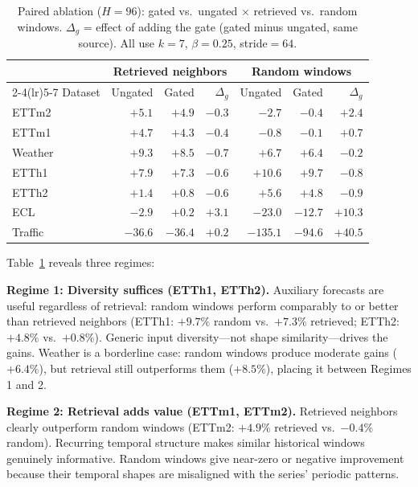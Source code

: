 \documentclass{article}
\begin{document}
\begin{table}[t]
\centering
\caption{Paired ablation ($H{=}96$): gated vs.\ ungated $\times$ retrieved vs.\ random windows. $\Delta_g$ = effect of adding the gate (gated minus ungated, same source). All use $k{=}7$, $\beta{=}0.25$, stride${=}64$.}
\label{tab:decomp}
\small
\begin{tabular}{l r r r r r r}
\toprule
& \multicolumn{3}{c}{Retrieved neighbors} & \multicolumn{3}{c}{Random windows} \\
\cmidrule(lr){2-4}\cmidrule(lr){5-7}
Dataset & Ungated & Gated & $\Delta_g$ & Ungated & Gated & $\Delta_g$ \\
\midrule
ETTm2 & $+5.1$ & $+4.9$ & $-0.3$ & $-2.7$ & $-0.4$ & $+2.4$ \\
ETTm1 & $+4.7$ & $+4.3$ & $-0.4$ & $-0.8$ & $-0.1$ & $+0.7$ \\
Weather & $+9.3$ & $+8.5$ & $-0.7$ & $+6.7$ & $+6.4$ & $-0.2$ \\
ETTh1 & $+7.9$ & $+7.3$ & $-0.6$ & $+10.6$ & $+9.7$ & $-0.8$ \\
ETTh2 & $+1.4$ & $+0.8$ & $-0.6$ & $+5.6$ & $+4.8$ & $-0.9$ \\
\midrule
ECL & $-2.9$ & $+0.2$ & $\mathbf{+3.1}$ & $-23.0$ & $-12.7$ & $\mathbf{+10.3}$ \\
Traffic & $-36.6$ & $-36.4$ & $+0.2$ & $-135.1$ & $-94.6$ & $\mathbf{+40.5}$ \\
\bottomrule
\end{tabular}
\end{table}

Table~\ref{tab:decomp} reveals three regimes:

\textbf{Regime 1: Diversity suffices (ETTh1, ETTh2).} Auxiliary forecasts are useful regardless of retrieval: random windows perform comparably to or better than retrieved neighbors (ETTh1: $+9.7\%$ random vs.\ $+7.3\%$ retrieved; ETTh2: $+4.8\%$ vs.\ $+0.8\%$). Generic input diversity---not shape similarity---drives the gains. Weather is a borderline case: random windows produce moderate gains ($+6.4\%$), but retrieval still outperforms them ($+8.5\%$), placing it between Regimes 1 and 2.

\textbf{Regime 2: Retrieval adds value (ETTm1, ETTm2).} Retrieved neighbors clearly outperform random windows (ETTm2: $+4.9\%$ retrieved vs.\ $-0.4\%$ random). Recurring temporal structure makes similar historical windows genuinely informative. Random windows give near-zero or negative improvement because their temporal shapes are misaligned with the series' periodic patterns.
\end{document}
